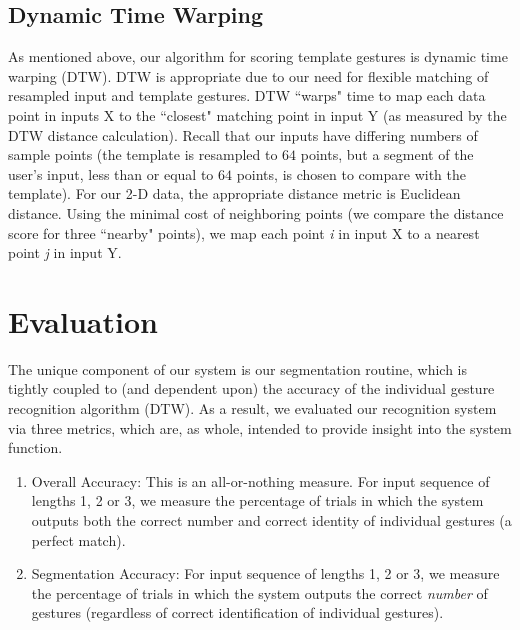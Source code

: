 \documentclass[twoside]{article}
\begin{document}
\begin{multicols}{2}
\subsection*{Dynamic Time Warping}

As mentioned above, our algorithm for scoring template gestures is dynamic time
warping (DTW). DTW is appropriate due to our need for flexible matching of
resampled input and template gestures. DTW ``warps" time to map each data point in
inputs X to the ``closest" matching point in input Y (as measured by the DTW distance
calculation). Recall that our inputs have differing numbers of sample points
(the template is resampled to $64$ points, but a segment of the user's input,
less than or equal to $64$ points, is chosen to compare with the template). For
our 2-D data, the appropriate distance metric is Euclidean distance. Using the
minimal cost of neighboring points (we compare the distance score for three ``nearby" points),
we map each point \emph{i} in input X to a nearest point \emph{j} in input Y.

\section{Evaluation}


The unique component of our system is our segmentation routine, which is
tightly coupled to (and dependent upon) the accuracy of the individual gesture
recognition algorithm (DTW). As a result, we evaluated our recognition system via three
metrics, which are, as whole, intended to provide insight into the system function.

\begin{enumerate}
\item Overall Accuracy: This is an all-or-nothing measure. For input sequence of
lengths 1, 2 or 3, we measure the percentage of trials in which the system
outputs both the correct number and correct identity of individual gestures (a perfect match).

\item
Segmentation Accuracy: For input sequence of lengths 1, 2 or 3, we measure the
percentage of trials in which the system outputs the correct \emph{number} of
gestures (regardless of correct identification of individual gestures).


\end{enumerate}
\end{multicols}
\end{document}
